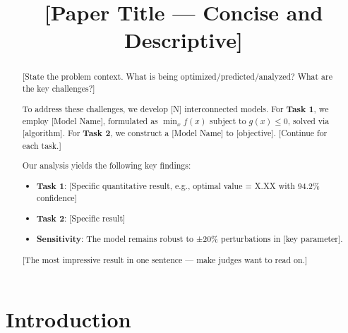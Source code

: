 \documentclass{mcmthesis}
\title{[Paper Title — Concise and Descriptive]}
\begin{document}
\begin{abstract}

[State the problem context. What is being optimized/predicted/analyzed?
What are the key challenges?]

To address these challenges, we develop [N] interconnected models.
For \textbf{Task 1}, we employ [Model Name], formulated as
$\min_{x} f(x)$ subject to $g(x) \leq 0$, solved via [algorithm].
For \textbf{Task 2}, we construct a [Model Name] to [objective].
[Continue for each task.]

Our analysis yields the following key findings:
\begin{itemize}[nosep]
    \item \textbf{Task 1}: [Specific quantitative result, e.g., optimal value = X.XX with 94.2\% confidence]
    \item \textbf{Task 2}: [Specific result]
    \item \textbf{Sensitivity}: The model remains robust to ±20\% perturbations in [key parameter].
\end{itemize}

[The most impressive result in one sentence — make judges want to read on.]

\end{abstract}

\keywords{[keyword1]; [keyword2]; [keyword3]; [keyword4]; [keyword5]}

\maketitle

\tableofcontents
\newpage

\section{Introduction}
\end{document}
